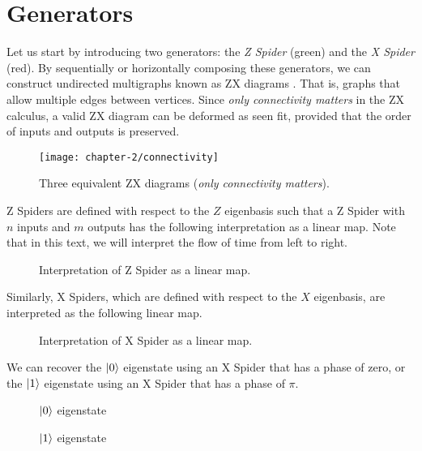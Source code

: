 \section{Generators}

Let us start by introducing two generators: the \textit{Z Spider} (green) and the \textit{X Spider} (red). By sequentially or horizontally composing these generators, we can construct undirected multigraphs known as ZX diagrams \cite{Wetering2020}. That is, graphs that allow multiple edges between vertices. Since \textit{only connectivity matters} in the ZX calculus, a valid ZX diagram can be deformed as seen fit, provided that the order of inputs and outputs is preserved.
\begin{figure}[H]
\centering
    \centering
    \texttt{[image: chapter-2/connectivity]}
    \caption{Three equivalent ZX diagrams (\textit{only connectivity matters}).}
\end{figure}

Z Spiders are defined with respect to the $Z$ eigenbasis such that a Z Spider with $n$ inputs and $m$ outputs has the following interpretation as a linear map. Note that in this text, we will interpret the flow of time from left to right.
\begin{figure}[H]
\centering
{}
\caption{Interpretation of Z Spider as a linear map.}
\end{figure}
Similarly, X Spiders, which are defined with respect to the $X$ eigenbasis, are interpreted as the following linear map.
\begin{figure}[H]
\centering
{}
\caption{Interpretation of X Spider as a linear map.}
\end{figure}

We can recover the $\ket 0$ eigenstate using an X Spider that has a phase of zero, or the $\ket 1$ eigenstate using an X Spider that has a phase of $\pi$.
\begin{figure}[H]
\centering
\begin{minipage}{.4\textwidth}
    \centering
    \caption{$\ket 0$ eigenstate}
\end{minipage}%
\begin{minipage}{.4\textwidth}
    \centering
    \caption{$\ket 1$ eigenstate}
\end{minipage}
\end{figure}

